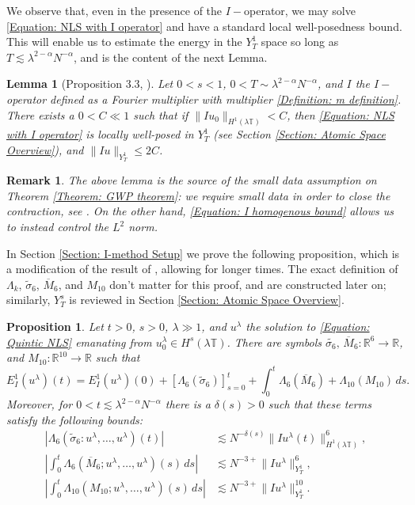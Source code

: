 \documentclass[12pt, letterpaper]{amsart}
\newtheorem{lemma}{Lemma}
\newtheorem{remark}{Remark}
\newtheorem{proposition}{Proposition}
\begin{document}
We observe that, even in the presence of the $I-$operator, we may solve \eqref{Equation: NLS with I operator} and have a standard local well-posedness bound. This will enable us to estimate the energy in the $Y^1_T$ space so long as $T\lesssim \lambda^{2-\alpha}N^{-\alpha}$, and is the content of the next Lemma.

\begin{lemma}[Proposition 3.3, \cite{schippa2024improved}]\label{Lemma: LWP}
    Let $0 < s < 1$, $0 < T\sim \lambda^{2-\alpha}N^{-\alpha}$, and $I$ the $I-$operator defined as a Fourier multiplier with multiplier \eqref{Definition: m definition}. There exists a $0 < C\ll 1$ such that if $\|Iu_0\|_{H^1(\lambda\mathbb{T})}< C$, then \eqref{Equation: NLS with I operator} is locally well-posed in $Y^1_T$ (see Section \ref{Section: Atomic Space Overview}), and $\|Iu\|_{Y^1_T}\leq 2C$.
\end{lemma}
\begin{remark}
The above lemma is the source of the small data assumption on Theorem \ref{Theorem: GWP theorem}: we require small data in order to close the contraction, see \cite[Proposition 3.1]{schippa2024improved}. On the other hand, \eqref{Equation: I homogenous bound} allows us to instead control the $L^2$ norm.
\end{remark}
In Section \ref{Section: I-method Setup} we prove the following proposition, which is a  modification of the result of \cite{schippa2024improved}, allowing for longer times. The exact definition of $\Lambda_k$, $\tilde{\sigma}_6$, $\overline{M}_6$, and $M_{10}$ don't matter for this proof, and are constructed later on; similarly, $Y_T^s$ is reviewed in Section \ref{Section: Atomic Space Overview}.
\begin{proposition}\label{Proposition: I method bounds}
    Let $t > 0$, $s > 0$, $\lambda \gg 1$, and $u^\lambda$ the solution to \eqref{Equation: Quintic NLS} emanating from $u_0^\lambda\in H^s(\lambda\mathbb{T})$. There are symbols $\tilde{\sigma_6},\, \overline{M}_6:\mathbb{R}^6\to\mathbb{R}$, and $M_{10}:\mathbb{R}^{10}\to\mathbb{R}$ such that
    \begin{equation}\label{Equation: I method FTC}
E^1_I(u^\lambda)(t) = E^1_I(u^\lambda)(0) + [\Lambda_6(\tilde{\sigma}_6)]_{s=0}^t + \int_0^t \Lambda_6(\overline{M}_6) + \Lambda_{10}(M_{10})\,ds.
    \end{equation}
    Moreover, for $0 < t \lesssim \lambda^{2-\alpha}N^{-\alpha}$ there is a $\delta(s) > 0$ such that these terms satisfy the following bounds:
    \begin{align*}
        \left|\Lambda_6(\tilde{\sigma}_6:u^\lambda,\dots,u^\lambda)(t)\right|&\lesssim N^{-\delta(s)}\|Iu^\lambda(t)\|_{H^1(\lambda\mathbb{T})}^6,\\
        \left|\int_0^t\Lambda_6(\overline{M}_6;u^\lambda,\dots,u^\lambda)(s)\,ds\right|&\lesssim N^{-3+}\|Iu^\lambda\|_{Y^1_T}^6,\\
        \left|\int_0^t\Lambda_{10}(M_{10};u^\lambda,\dots,u^\lambda)(s)\,ds\right|&\lesssim N^{-3+}\|Iu^\lambda\|_{Y^1_T}^{10}.
    \end{align*}
\end{proposition}
\end{document}
